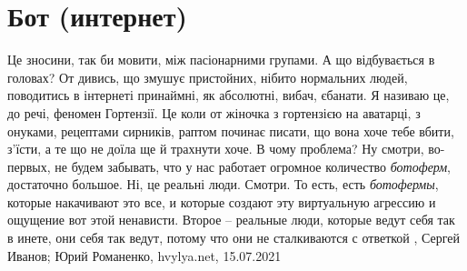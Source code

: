  
 
 
 
 
\chapter{Бот (интернет)}

Це зносини, так би мовити, між пасіонарними групами. А що відбувається в
головах? От дивись, що змушує пристойних, нібито нормальних людей, поводитись в
інтернеті принаймні, як абсолютні, вибач, єбанати.  Я називаю це, до речі,
феномен Гортензії. Це коли от жіночка з гортензією на аватарці, з онуками,
рецептами сирників, раптом починає писати, що вона хоче тебе вбити, з’їсти, а
те що не доїла ще й трахнути хоче. В чому проблема?  Ну смотри, во-первых, не
будем забывать, что у нас работает огромное количество \emph{ботоферм},
достаточно большое.  Ні, це реальні люди.  Смотри. То есть, есть
\emph{ботофермы}, которые накачивают это все, и которые создают эту виртуальную
агрессию и ощущение вот этой ненависти. Второе – реальные люди, которые ведут
себя так в инете, они себя так ведут, потому что они не сталкиваются с ответкой
, 
Сергей Иванов; Юрий Романенко, hvylya.net, 15.07.2021


